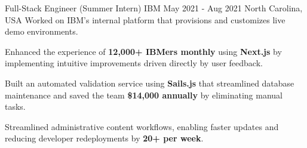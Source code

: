 \begin{cventries}
    \cventry
    {Full-Stack Engineer (Summer Intern)} %
    {IBM} %
    {May 2021 - Aug 2021} %
    {North Carolina, USA} %
    {Worked on IBM's internal platform that provisions and customizes live demo environments.}
    {
      \begin{cvitems} %
        \item {Enhanced the experience of \textbf{12,000+ IBMers monthly} using \textbf{Next.js} by implementing intuitive improvements driven directly by user feedback.}
        \item {Built an automated validation service using \textbf{Sails.js} that streamlined database maintenance and saved the team \textbf{\$14,000 annually} by eliminating manual tasks.}
        \item {Streamlined administrative content workflows, enabling faster updates and reducing developer redeployments by \textbf{20+ per week}.}
      \end{cvitems}
    }


\end{cventries}
